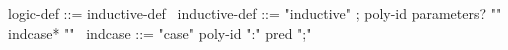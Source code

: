 \begin{syntax}
  logic-def ::= inductive-def
  \
  inductive-def ::= "inductive" ;
  poly-id parameters? "{" indcase* "}"
  \
  indcase ::= "case" poly-id ":" pred ";"
\end{syntax}
